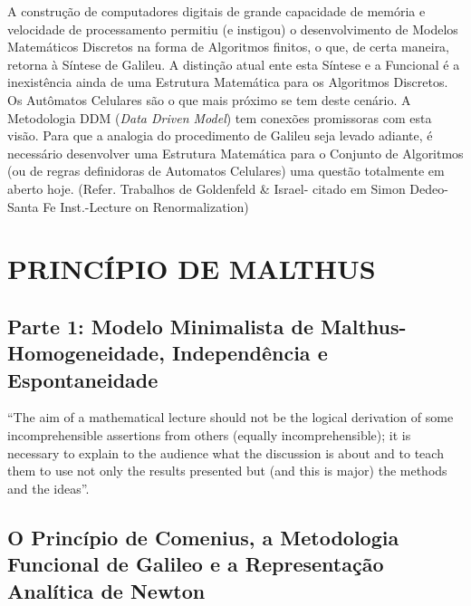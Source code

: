    A construção de computadores digitais de grande capacidade de memória e velocidade de processamento permitiu (e instigou) o desenvolvimento de Modelos Matemáticos Discretos na forma de Algoritmos finitos, o que, de certa maneira, retorna à Síntese de Galileu. A distinção atual ente esta Síntese e a Funcional é a inexistência ainda de uma Estrutura Matemática para os Algoritmos Discretos. Os Autômatos Celulares são o que mais próximo se tem deste cenário. A Metodologia DDM (\textit{Data Driven Model}) tem conexões promissoras com esta visão. Para que a analogia do procedimento de Galileu seja levado adiante, é necessário desenvolver uma Estrutura Matemática para o Conjunto de Algoritmos (ou de regras definidoras de Automatos Celulares) uma questão totalmente em aberto hoje. (Refer. Trabalhos de Goldenfeld \& Israel- citado em Simon Dedeo-Santa Fe Inst.-Lecture on Renormalization)





\chapter{PRINCÍPIO DE MALTHUS}
\addt


\section*{Parte 1: Modelo Minimalista de Malthus-Homogeneidade, Independência e Espontaneidade}

\begin{citacao}
``The aim of a mathematical lecture should not be the logical derivation of some incomprehensible assertions from others (equally incomprehensible); it is necessary to explain to the audience what the discussion is about and to teach them to use not only the results presented but (and this is major) the methods and the ideas''.

\end{citacao}

\section{O Princípio de Comenius, a Metodologia Funcional de Galileo e a Representação Analítica de Newton}

